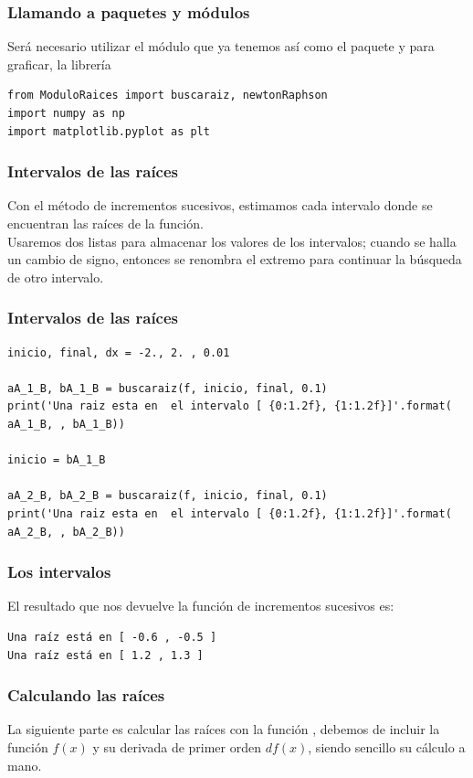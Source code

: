 \begin{frame}[fragile]
\frametitle{Llamando a paquetes y módulos}
Será necesario utilizar el módulo  que ya tenemos así como el paquete  y para graficar, la librería 
\begin{lstlisting}[caption=Llamada a paquetes y funciones, style=codigopython]
from ModuloRaices import buscaraiz, newtonRaphson
import numpy as np
import matplotlib.pyplot as plt
\end{lstlisting}
\end{frame}
\begin{frame}[fragile]
\frametitle{Intervalos de las raíces}
Con el método de incrementos sucesivos, estimamos cada intervalo donde se encuentran las raíces de la función.
\\
\bigskip
Usaremos dos listas para almacenar los valores de los intervalos; cuando se halla un cambio de signo, entonces se renombra el extremo para continuar la búsqueda de otro intervalo.
\end{frame}
\begin{frame}
\frametitle{Intervalos de las raíces}
\begin{lstlisting}[caption=Intervalos para las raíces, style=codigopython]
inicio, final, dx = -2., 2. , 0.01

aA_1_B, bA_1_B = buscaraiz(f, inicio, final, 0.1)
print('Una raiz esta en  el intervalo [ {0:1.2f}, {1:1.2f}]'.format( aA_1_B, , bA_1_B))

inicio = bA_1_B

aA_2_B, bA_2_B = buscaraiz(f, inicio, final, 0.1)
print('Una raiz esta en  el intervalo [ {0:1.2f}, {1:1.2f}]'.format( aA_2_B, , bA_2_B))
\end{lstlisting}
\end{frame}
\begin{frame}[fragile]
\frametitle{Los intervalos}
El resultado que nos devuelve la función de incrementos sucesivos es:
\begin{verbatim}
Una raíz está en [ -0.6 , -0.5 ]
Una raíz está en [ 1.2 , 1.3 ]
\end{verbatim}
\end{frame}
\begin{frame}
\frametitle{Calculando las raíces}
La siguiente parte es calcular las raíces con la función , debemos de incluir la función $f(x)$ y su derivada de primer orden $df(x)$, siendo sencillo su cálculo a mano.
\end{frame}

